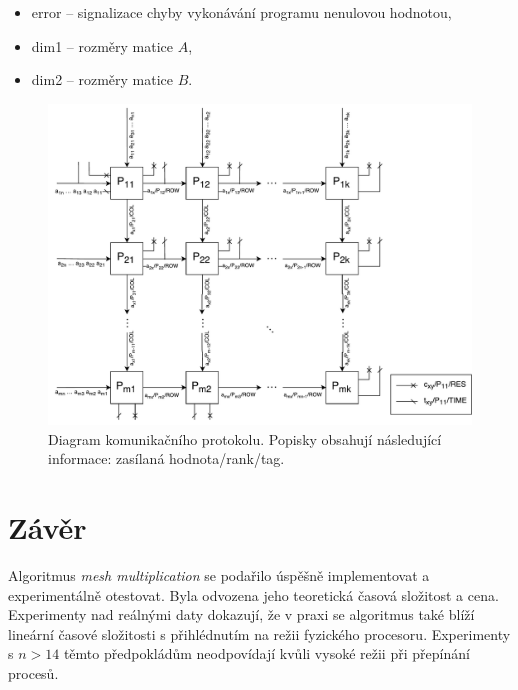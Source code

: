 \documentclass[11pt,a4paper]{article}
\begin{document}
\begin{itemize}
    \item{error -- signalizace chyby vykonávání programu nenulovou hodnotou,}
    \item{dim1 -- rozměry matice $A$,}
    \item{dim2 -- rozměry matice $B$.}
\end{itemize}

\begin{figure}[!h]
    \includegraphics[width=1\linewidth]{protokol}
    \centering
    \caption{Diagram komunikačního protokolu. Popisky obsahují následující informace: zasílaná hodnota/rank/tag.}
    \label{proto_schema}
\end{figure}


\section{Závěr}

Algoritmus \textit{mesh multiplication} se podařilo úspěšně implementovat a experimentálně otestovat. Byla odvozena jeho teoretická časová složitost a cena. Experimenty nad reálnými daty dokazují, že v praxi se algoritmus také blíží lineární časové složitosti s přihlédnutím na režii fyzického procesoru. Experimenty s $n > 14$ těmto předpokládům neodpovídají kvůli vysoké režii při přepínání procesů.
\end{document}
